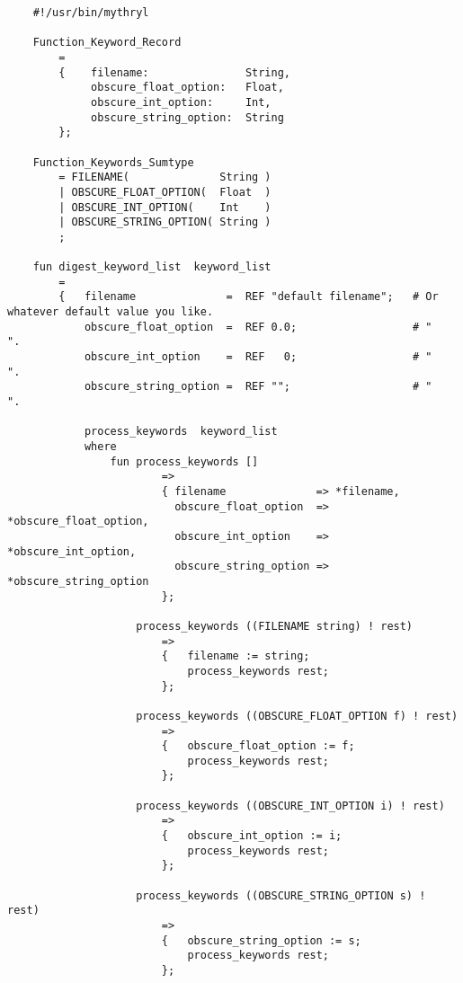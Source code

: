 \begin{verbatim}
    #!/usr/bin/mythryl

    Function_Keyword_Record
        =
        {    filename:               String,
             obscure_float_option:   Float,
             obscure_int_option:     Int,
             obscure_string_option:  String
        };

    Function_Keywords_Sumtype
        = FILENAME(              String )
        | OBSCURE_FLOAT_OPTION(  Float  )
        | OBSCURE_INT_OPTION(    Int    )
        | OBSCURE_STRING_OPTION( String )
        ;

    fun digest_keyword_list  keyword_list
        =
        {   filename              =  REF "default filename";   # Or whatever default value you like.
            obscure_float_option  =  REF 0.0;                  # "                                ".
            obscure_int_option    =  REF   0;                  # "                                ".
            obscure_string_option =  REF "";                   # "                                ".

            process_keywords  keyword_list
            where
                fun process_keywords []
                        =>
                        { filename              => *filename,
                          obscure_float_option  => *obscure_float_option,
                          obscure_int_option    => *obscure_int_option,
                          obscure_string_option => *obscure_string_option
                        };

                    process_keywords ((FILENAME string) ! rest)
                        =>
                        {   filename := string;
                            process_keywords rest;
                        };

                    process_keywords ((OBSCURE_FLOAT_OPTION f) ! rest)
                        =>
                        {   obscure_float_option := f;
                            process_keywords rest;
                        };

                    process_keywords ((OBSCURE_INT_OPTION i) ! rest)
                        =>
                        {   obscure_int_option := i;
                            process_keywords rest;
                        };

                    process_keywords ((OBSCURE_STRING_OPTION s) ! rest)
                        =>
                        {   obscure_string_option := s;
                            process_keywords rest;
                        };


\end{verbatim}
